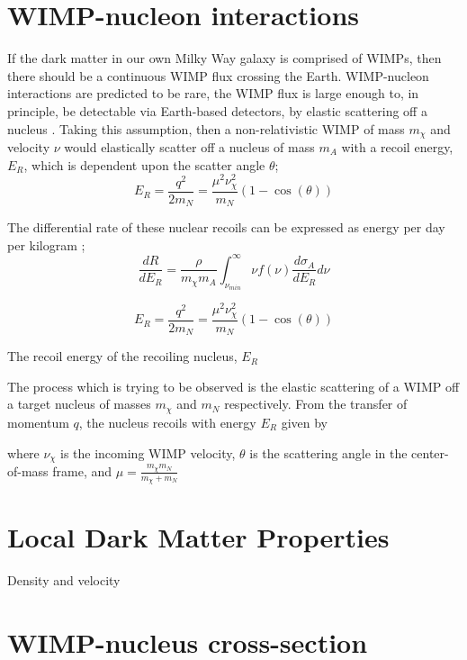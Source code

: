 \section{WIMP-nucleon interactions} \label{sec:wimp_nucleus_interactions}
\par
If the dark matter in our own Milky Way galaxy is comprised of WIMPs, then there should be a continuous WIMP flux crossing the Earth.
WIMP-nucleon interactions are predicted to be rare, the WIMP flux is large enough to, in principle, be detectable via Earth-based detectors, by elastic scattering off a nucleus \cite{wimp_nucleon_interactions_first_suggestion_ref,supersymmetric_dark_matter_ref}.
Taking this assumption, then a non-relativistic WIMP of mass $m_{\chi}$ and velocity $\nu$ would  elastically scatter off a nucleus of mass $m_{A}$ with a recoil energy, $E_{R}$, which is dependent upon the scatter angle $\theta$;
\begin{equation}
    E_{R} = \frac{q^{2}}{2m_{N}} = \frac{\mu^2\nu_{\chi}^2}{m_{N}}(1-\cos(\theta))
\end{equation}

\par
The differential rate of these nuclear recoils can be expressed as energy per day per kilogram \cite{direct_detection_of_wimps_ref};
\begin{equation}
    \frac{dR}{dE_{R}} = \frac{\rho}{m_{\chi}m_{A}} \int_{\nu_{min}}^{\infty} \nu f(\nu) \frac{d\sigma_{A}}{dE_{R}} d\nu
\end{equation}


\begin{equation}
    E_{R} = \frac{q^{2}}{2m_{N}} = \frac{\mu^2\nu_{\chi}^2}{m_{N}}(1-\cos(\theta))
\end{equation}

The recoil energy of the recoiling nucleus, $E_{R}$




\par
The process which is trying to be observed is the elastic scattering of a WIMP off a target nucleus of masses $m_{\chi}$ and $m_{N}$ respectively.
From the transfer of momentum $q$, the nucleus recoils with energy $E_{R}$ given by


where $\nu_{\chi}$ is the incoming WIMP velocity, $\theta$ is the scattering angle in the center-of-mass frame, and $\mu=\frac{m_{\chi}m_{N}}{m_{\chi} + m_{N}}$


\section{Local Dark Matter Properties}
\par
Density and velocity




\section{WIMP-nucleus cross-section}
\par
